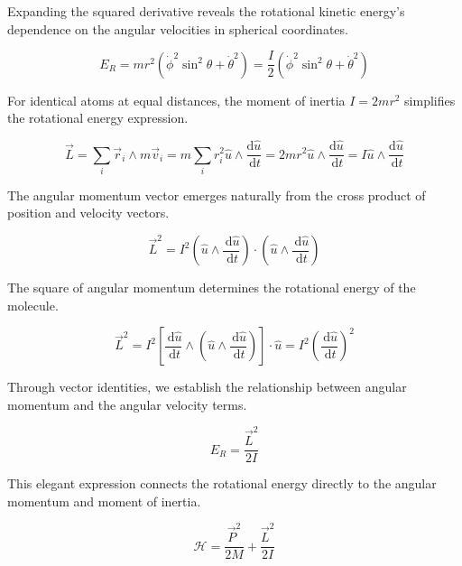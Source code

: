 \documentclass[italian]{HKNdocument}
\begin{document}
Expanding the squared derivative reveals the rotational kinetic energy's dependence on the angular velocities in spherical coordinates.

\begin{equation}
E_{R}=m r^{2}\left(\dot{\phi}^{2} \sin ^{2} \theta+\dot{\theta}^{2}\right)=\frac{I}{2}\left(\dot{\phi}^{2} \sin ^{2} \theta+\dot{\theta}^{2}\right) \label{eq:8.69}
\end{equation}

For identical atoms at equal distances, the moment of inertia $I=2mr^2$ simplifies the rotational energy expression.

\begin{equation}
\vec{L}=\sum_{i} \vec{r}_{i} \wedge m \vec{v}_{i}=m \sum_{i} r_{i}^{2} \hat{u} \wedge \frac{\mathrm{d} \hat{u}}{\, \mathrm{d} t}=2 m r^{2} \hat{u} \wedge \frac{\mathrm{d} \hat{u}}{\, \mathrm{d} t}=I \hat{u} \wedge \frac{\mathrm{d} \hat{u}}{\, \mathrm{d} t} \label{eq:8.70}
\end{equation}

The angular momentum vector emerges naturally from the cross product of position and velocity vectors.

\begin{equation}
\vec{L}^{2}=I^{2}\left(\hat{u} \wedge \frac{\, \mathrm{d} \hat{u}}{\, \mathrm{d} t}\right) \cdot\left(\hat{u} \wedge \frac{\, \mathrm{d} \hat{u}}{\, \mathrm{d} t}\right) \label{eq:8.71}
\end{equation}

The square of angular momentum determines the rotational energy of the molecule.

\begin{equation}
\vec{L}^{2}=I^{2}\left[\frac{\, \mathrm{d} \hat{u}}{\, \mathrm{d} t} \wedge\left(\hat{u} \wedge \frac{\, \mathrm{d} \hat{u}}{\, \mathrm{d} t}\right)\right] \cdot \hat{u}=I^{2}\left(\frac{\, \mathrm{d} \hat{u}}{\, \mathrm{d} t}\right)^{2} \label{eq:8.72}
\end{equation}

Through vector identities, we establish the relationship between angular momentum and the angular velocity terms.

\begin{equation}
E_{R}=\frac{\vec{L}^{2}}{2 I} \label{eq:8.73}
\end{equation}

This elegant expression connects the rotational energy directly to the angular momentum and moment of inertia.

\begin{equation}
\mathcal{H}=\frac{\vec{P}^{2}}{2 M}+\frac{\vec{L}^{2}}{2 I} \label{eq:8.74}
\end{equation}
\end{document}
